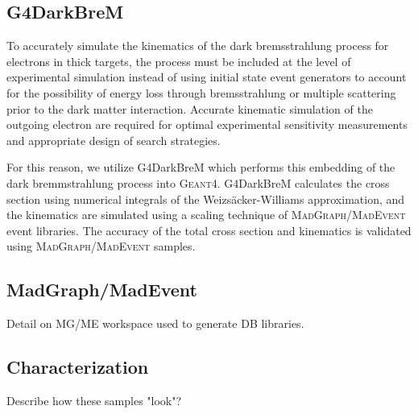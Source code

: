 \subsection{G4DarkBreM}
To accurately simulate the kinematics of the dark bremsstrahlung process for electrons in thick targets, the process must be included at the level of experimental simulation instead of using initial state event generators to account for the possibility of energy loss through bremsstrahlung or multiple scattering prior to the dark matter interaction. Accurate kinematic simulation of the outgoing electron are required for optimal experimental sensitivity measurements and appropriate design of search strategies.

For this reason, we utilize G4DarkBreM \cite{g4darkbrem} which performs this embedding of the dark bremmstrahlung process into \textsc{Geant}4. G4DarkBreM calculates the cross section using numerical integrals of the Weizs\"{a}cker-Williams approximation, and the kinematics are simulated using a scaling technique of \textsc{MadGraph/MadEvent} event libraries. The accuracy of the total cross section and kinematics is validated using \textsc{MadGraph/MadEvent} samples.

\subsection{MadGraph/MadEvent}
Detail on MG/ME workspace used to generate DB libraries.

\subsection{Characterization}
Describe how these samples "look"?

